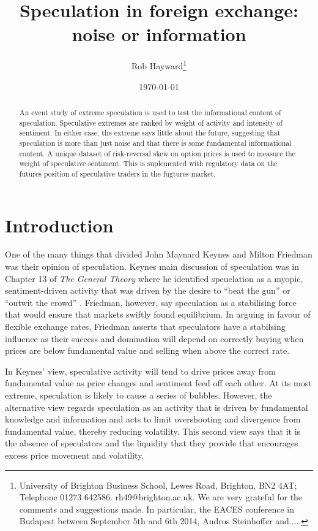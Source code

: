 \documentclass[12pt, a4paper, oneside]{article} %
\begin{document}
\title{Speculation in foreign exchange: noise or information}
\author{Rob Hayward\footnote{University of Brighton Business School, Lewes Road, Brighton, BN2 4AT; Telephone 01273 642586.  rh49@brighton.ac.uk.  We are very grateful for the comments and suggestions made.  In particular, the EACES conference in Budapest between September 5th and 6th 2014, Andros Steinhoffer and.....}} 
\date{\today}
\maketitle
\begin{abstract}
An event study of extreme speculation is used to test the informational content of speculation.  Speculative extremes are ranked by weight of activity and intensity of sentiment.  In either case, the extreme says little about the future, suggesting that speculation is more than just noise and that there is some fundamental informational content. A unique dataset of risk-reversal skew on option prices is used to measure the weight of speculative sentiment.  This is suplemented with regulatory data on the futures position of speculative traders in the fugtures market.  
\end{abstract}

\section{Introduction}

One of the many things that divided John Maynard Keynes and Milton Friedman was their opinion of speculation.   Keynes main discussion of speculation was in Chapter 13 of \emph{The General Theory} where he identified speuclation as a myopic, sentiment-driven activity that was driven by the desire to ``beat the gun'' or  ``outwit the crowd'' \citep[p. 101]{Keynes1936}.  Friedman, however, say speculation as a stabilising force that would ensure that markets swiftly found equilibrium. In arguing in favour of flexible exchange rates, Friedman asserts that speculators have a stabilsing influence as their success and domination will depend on correctly buying when prices are below fundamental value and selling when above the correct rate. 

In Keynes' view, speculative activity will tend to drive prices away from fundamental value as price changes and sentiment feed off each other.  At its most extreme, speculation is likely to cause a series of bubbles.  However, the alternative view regards speculation as an activity that is driven by fundamental knowledge and information and acts to limit overshooting and divergence from fundamental value, thereby reducing volatility.  This second view says that it is the absence of speculators and the liquidity that they provide that encourages excess price movement and volatility.  
\end{document}
